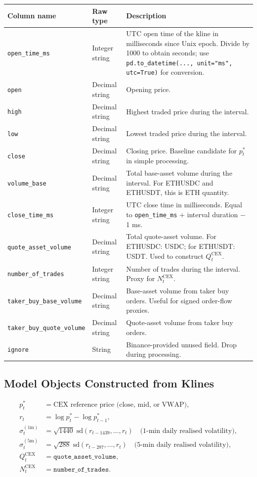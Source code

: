 \documentclass[11pt,a4paper]{article}
\begin{document}
\begin{xltabular}{\linewidth}{L{4.8cm}L{2.8cm}Y}
\toprule
\textbf{Column name} & \textbf{Raw type} & \textbf{Description} \\
\midrule
\texttt{open\_time\_ms} & Integer string &
  UTC open time of the kline in milliseconds since Unix epoch.
  Divide by 1000 to obtain seconds; use
  \texttt{pd.to\_datetime(..., unit="ms", utc=True)} for conversion. \\
\texttt{open} & Decimal string &
  Opening price. \\
\texttt{high} & Decimal string &
  Highest traded price during the interval. \\
\texttt{low} & Decimal string &
  Lowest traded price during the interval. \\
\texttt{close} & Decimal string &
  Closing price. Baseline candidate for $p_t^{*}$ in simple
  processing. \\
\texttt{volume\_base} & Decimal string &
  Total base-asset volume during the interval. For ETHUSDC and
  ETHUSDT, this is ETH quantity. \\
\texttt{close\_time\_ms} & Integer string &
  UTC close time in milliseconds. Equal to
  \texttt{open\_time\_ms} $+$ interval duration $-$ 1 ms. \\
\texttt{quote\_asset\_volume} & Decimal string &
  Total quote-asset volume. For ETHUSDC: USDC; for ETHUSDT: USDT.
  Used to construct $Q_t^{\mathrm{CEX}}$. \\
\texttt{number\_of\_trades} & Integer string &
  Number of trades during the interval. Proxy for
  $N_t^{\mathrm{CEX}}$. \\
\texttt{taker\_buy\_base\_volume} & Decimal string &
  Base-asset volume from taker buy orders. Useful for signed
  order-flow proxies. \\
\texttt{taker\_buy\_quote\_volume} & Decimal string &
  Quote-asset volume from taker buy orders. \\
\texttt{ignore} & String &
  Binance-provided unused field. Drop during processing. \\
\bottomrule
\end{xltabular}

\subsection{Model Objects Constructed from Klines}

\begin{align*}
  p_t^{*} &= \text{CEX reference price (close, mid, or VWAP)}, \\
  r_t &= \log p_t^{*} - \log p_{t-1}^{*}, \\
  \sigma_t^{(1\mathrm{m})} &=
    \sqrt{1440}\;\mathrm{sd}\!\left(r_{t-1439},\ldots,r_t\right)
    \quad\text{(1-min daily realised volatility)},\\
  \sigma_t^{(5\mathrm{m})} &=
    \sqrt{288}\;\mathrm{sd}\!\left(r_{t-287},\ldots,r_t\right)
    \quad\text{(5-min daily realised volatility)},\\
  Q_t^{\mathrm{CEX}} &= \texttt{quote\_asset\_volume}, \\
  N_t^{\mathrm{CEX}} &= \texttt{number\_of\_trades}.
\end{align*}
\end{document}
